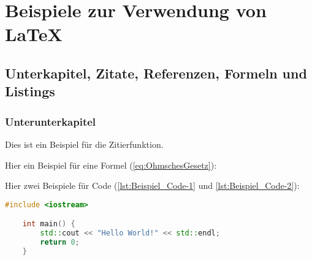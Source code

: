 


\chapter{Beispiele zur Verwendung von LaTeX}
   
\section{Unterkapitel, Zitate, Referenzen, Formeln und Listings}
\label{sec:Unterkapitel}

\subsection{Unterunterkapitel}

Dies ist ein Beispiel für die Zitierfunktion. \cite[Vgl.][S. 1 ff.]{2024} 


\vspace{0.5cm}
Hier ein Beispiel für eine Formel (\ref{eq:OhmschesGesetz}):

\vspace{0.5cm}
Hier zwei Beispiele für Code (\ref{lst:Beispiel_Code-1} und \ref{lst:Beispiel_Code-2}):

\begin{lstlisting}[language=C++, caption={Beispiel: direktes einfügen von Code}, label={lst:Beispiel_Code-1}]
    #include <iostream>

    int main() {
        std::cout << "Hello World!" << std::endl;
        return 0;
    }
\end{lstlisting}

% 


\newpage
